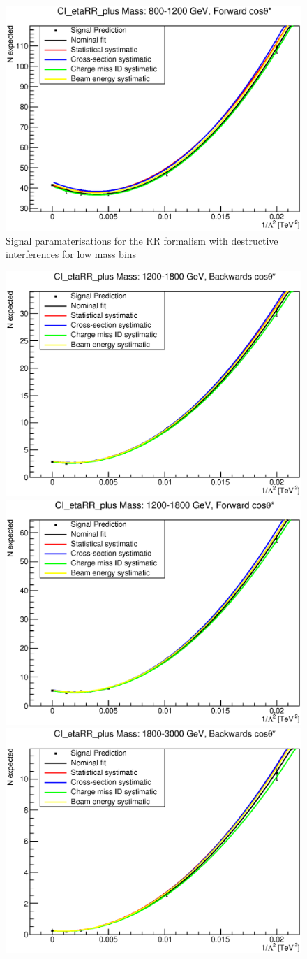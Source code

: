 \begin{figure}[ht]
			\includegraphics[width=0.49\linewidth]{images/thesis_fits/CI_2D_etaRR_plus_Mass_800-1200_GeV_CTS_0_1.eps}
		\caption{Signal paramaterisations for the RR formalism with destructive interferences for low mass bins}
		\label{fig:parm_RR_p_1}
	\end{figure}

	\begin{figure}[ht]
		\centering
			\includegraphics[width=0.49\linewidth]{images/thesis_fits/CI_2D_etaRR_plus_Mass_1200-1800_GeV_CTS_-1_0.eps}
			\includegraphics[width=0.49\linewidth]{images/thesis_fits/CI_2D_etaRR_plus_Mass_1200-1800_GeV_CTS_0_1.eps}
			\includegraphics[width=0.49\linewidth]{images/thesis_fits/CI_2D_etaRR_plus_Mass_1800-3000_GeV_CTS_-1_0.eps}

\end{figure}
